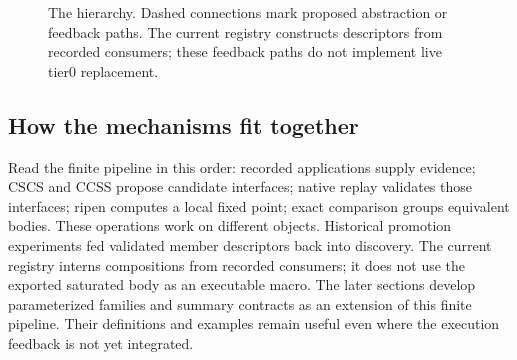 \documentclass[11pt,a4paper]{article}
\newcommand{\CS}{\mathsf{CS}}
\begin{document}
\begin{figure}[t]
\centering
{}
\caption{The hierarchy. Dashed connections mark proposed abstraction or feedback
paths. The current registry constructs descriptors from recorded consumers;
these feedback paths do not implement live tier0 replacement.}
\label{fig:pipeline}
\end{figure}

\subsection{How the mechanisms fit together}
Read the finite pipeline in this order: recorded applications supply evidence;
CSCS and CCSS propose candidate interfaces; native replay validates those interfaces;
ripen computes a local fixed point; exact comparison groups equivalent bodies.
These operations work on different objects. Historical promotion experiments fed validated member descriptors back into
discovery. The current registry interns compositions from recorded consumers;
it does not use the exported saturated body as an executable macro. The later sections develop parameterized families and
summary contracts as an extension of this finite pipeline. Their definitions and
examples remain useful even where the execution feedback is not yet integrated.
\end{document}
